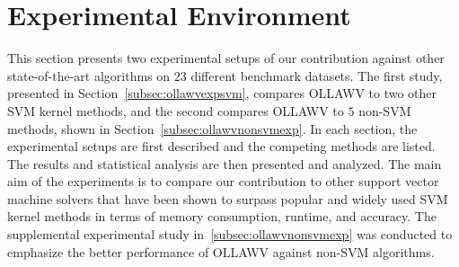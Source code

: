\documentclass[reqno]{vcuthesis}
\numberwithin{equation}{chapter}
\begin{document}
\section{Experimental Environment}
This section presents two experimental setups of our contribution against other state-of-the-art algorithms on $23$ different benchmark datasets. The first study, presented in Section~\ref{subsec:ollawvexpsvm}, compares OLLAWV to two other SVM kernel methods, and the second compares OLLAWV to $5$ non-SVM methods, shown in Section~\ref{subsec:ollawvnonsvmexp}. In each section, the experimental setups are first described and the competing methods are listed. The results and statistical analysis are then presented and analyzed. The main aim of the experiments is to compare our contribution to other support vector machine solvers that have been shown to surpass popular and widely used SVM kernel methods in terms of memory consumption, runtime, and accuracy. The supplemental experimental study in~\ref{subsec:ollawvnonsvmexp} was conducted to emphasize the better performance of OLLAWV against non-SVM algorithms.
\end{document}
